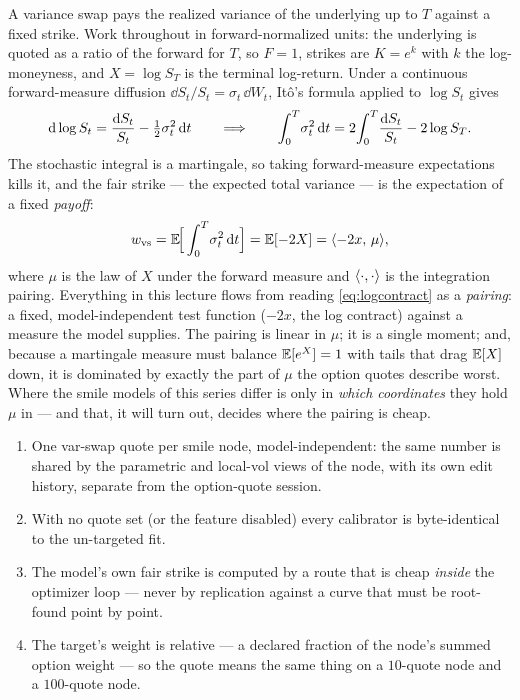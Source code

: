 \documentclass[11pt]{article}
\newcommand{\wvs}{w_{\mathrm{vs}}}
\begin{document}
A variance swap pays the realized variance of the underlying up to $T$
against a fixed strike.  Work throughout in forward-normalized units: the
underlying is quoted as a ratio of the forward for $T$, so $F=1$, strikes
are $K=e^{k}$ with $k$ the log-moneyness, and $X=\log S_T$ is the terminal
log-return.  Under a continuous forward-measure diffusion
$\dd S_t/S_t=\sigma_t\,\dd W_t$, It\^o's formula applied to $\log S_t$
gives
\begin{equation}
\mathrm{d} \log S_t=\frac{\mathrm{d} S_t}{S_t}-\tfrac12\sigma_t^2\,\mathrm{d} t
\qquad\Longrightarrow\qquad
\int_0^T\!\sigma_t^2\,\mathrm{d} t
=2\!\int_0^T\!\frac{\mathrm{d} S_t}{S_t}-2\log S_T .
\label{eq:ito}
\end{equation}
The stochastic integral is a martingale, so taking forward-measure
expectations kills it, and the fair strike --- the expected total
variance --- is the expectation of a fixed \emph{payoff}:
\begin{equation}
\wvs=\E\!\Big[\int_0^T\!\sigma_t^2\,\dd t\Big]=\E[-2X]
=\inner{-2x,\,\mu},
\label{eq:logcontract}
\end{equation}
where $\mu$ is the law of $X$ under the forward measure and
$\langle\cdot,\cdot\rangle$ is the integration pairing.  Everything in this
lecture flows from reading \eqref{eq:logcontract} as a \emph{pairing}: a
fixed, model-independent test function ($-2x$, the log contract) against
a measure the model supplies.  The pairing is linear in $\mu$; it is a
single moment; and, because a martingale measure must balance
$\mathbb{E}[e^X]=1$ with tails that drag $\mathbb{E}[X]$ down, it is dominated by exactly
the part of $\mu$ the option quotes describe worst.  Where the smile
models of this series differ is only in \emph{which coordinates} they
hold $\mu$ in --- and that, it will turn out, decides where the pairing
is cheap.

\begin{invariant}
\begin{enumerate}[leftmargin=1.6em]
\item One var-swap quote per smile node, model-independent: the same
number is shared by the parametric and local-vol views of the node, with
its own edit history, separate from the option-quote session.
\item With no quote set (or the feature disabled) every calibrator is
byte-identical to the un-targeted fit.
\item The model's own fair strike is computed by a route that is cheap
\emph{inside} the optimizer loop --- never by replication against a curve
that must be root-found point by point.
\item The target's weight is relative --- a declared fraction of the
node's summed option weight --- so the quote means the same thing on a
$10$-quote node and a $100$-quote node.
\end{enumerate}
\end{invariant}
\end{document}

